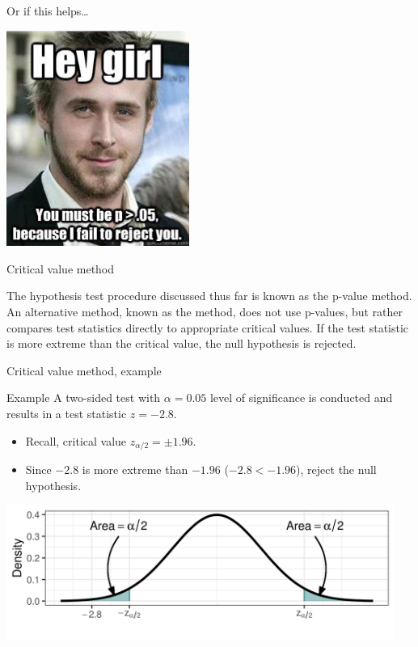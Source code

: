 \documentclass[xcolor=table, aspectratio=169, bigger]{beamer}
\begin{document}
\begin{frame}{Or if this helps\ldots}

{\centering
\includegraphics[width=2.35in]{../images/wk08_p_value_meme}
\par}

\end{frame}

\begin{frame}{Critical value method}
\begin{block}{}
The hypothesis test procedure discussed thus far is known as the p-value method. An alternative method, known as the  method, does not use p-values, but rather compares test statistics directly to appropriate critical values. If the test statistic is more extreme than the critical value, the null hypothesis is rejected.
\end{block}
\end{frame}

\begin{frame}{Critical value method, example}
\begin{exampleblock}{Example}
A two-sided test with $\alpha = 0.05$ level of significance is conducted and results in a test statistic $z= - 2.8$.
\begin{itemize}
\item Recall, critical value $z_{\alpha/2} = \pm 1.96$.
\item Since $-2.8$ is more extreme than $-1.96$ ($-2.8 < -1.96$), reject the null hypothesis.
\end{itemize} 
\end{exampleblock}

\medskip
{\centering
\includegraphics[width=5in]{../images/wk08_cv} 
\par}

\end{frame}
\end{document}
